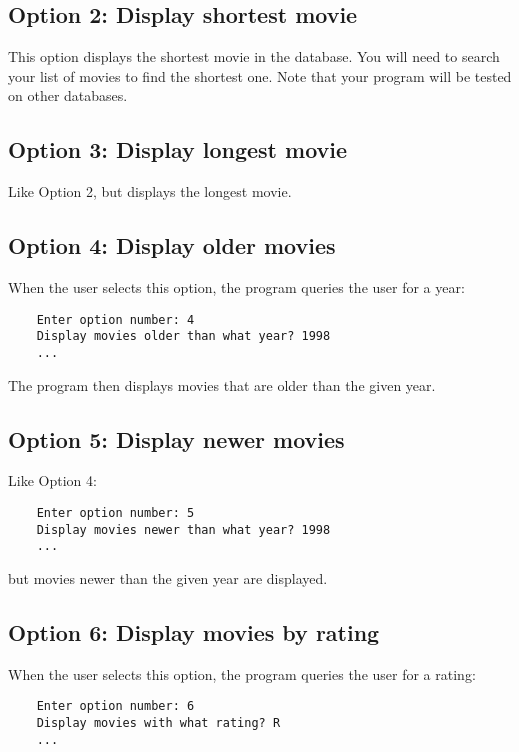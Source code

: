 \documentclass{article}
\begin{document}
\subsection*{Option 2: Display shortest movie}

This option displays the shortest movie in the database. You will need to
search your list of movies to find the shortest one.
Note that your
program will be tested on other databases.

\subsection*{Option 3: Display longest movie}

Like Option 2, but displays the longest movie.

\subsection*{Option 4: Display older movies}

When the user selects this option, the program queries the user for a year:

\begin{verbatim}
    Enter option number: 4
    Display movies older than what year? 1998
    ...
\end{verbatim}

The program then displays movies that are older than the given year.

\subsection*{Option 5: Display newer movies}

Like Option 4:

\begin{verbatim}
    Enter option number: 5
    Display movies newer than what year? 1998
    ...
\end{verbatim}

but movies newer than the given year are displayed.

\subsection*{Option 6: Display movies by rating}

When the user selects this option, the program queries the user for a rating:

\begin{verbatim}
    Enter option number: 6
    Display movies with what rating? R
    ...
\end{verbatim}
\end{document}
